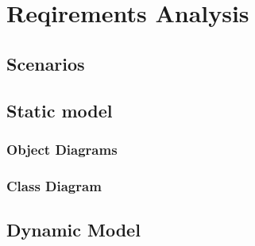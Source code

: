 \documentclass[stu]{apa7}
\begin{document}
{{\section{Reqirements Analysis}

\subsection{Scenarios}

\subsection{Static model}

\subsubsection{Object Diagrams}

\subsubsection{Class Diagram}

\subsection{Dynamic Model}

%
%
%
%

}}
\end{document}
